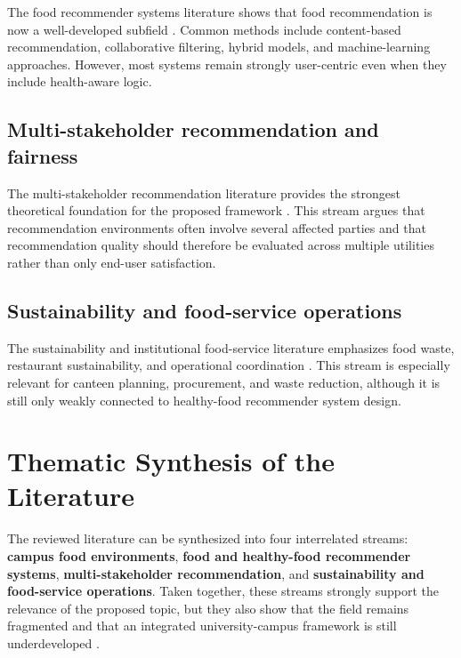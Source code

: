 \documentclass[journal]{IEEEtran}
\begin{document}
The food recommender systems literature shows that food recommendation
is now a well-developed subfield
\cite{bondevik2024, tran2018healthy, trattner2017food}. Common methods
include content-based recommendation, collaborative filtering, hybrid
models, and machine-learning approaches. However, most systems remain
strongly user-centric even when they include health-aware logic.

\subsection{Multi-stakeholder recommendation and
fairness}\label{multi-stakeholder-recommendation-and-fairness}

The multi-stakeholder recommendation literature provides the strongest
theoretical foundation for the proposed framework
\cite{zheng2017msr, abdollahpouri2019fairness, wu2021multifr}. This
stream argues that recommendation environments often involve several
affected parties and that recommendation quality should therefore be
evaluated across multiple utilities rather than only end-user
satisfaction.

\subsection{Sustainability and food-service
operations}\label{sustainability-and-food-service-operations}

The sustainability and institutional food-service literature emphasizes
food waste, restaurant sustainability, and operational coordination
\cite{peixoto2026sustainability, guimaraes2024waste}. This stream is
especially relevant for canteen planning, procurement, and waste
reduction, although it is still only weakly connected to healthy-food
recommender system design.

\section{Thematic Synthesis of the
Literature}\label{thematic-synthesis-of-the-literature}

The reviewed literature can be synthesized into four interrelated
streams: \textbf{campus food environments}, \textbf{food and
healthy-food recommender systems}, \textbf{multi-stakeholder
recommendation}, and \textbf{sustainability and food-service
operations}. Taken together, these streams strongly support the
relevance of the proposed topic, but they also show that the field
remains fragmented and that an integrated university-campus framework is
still underdeveloped
\cite{bondevik2024, caruso2025campus, zheng2017msr, peixoto2026sustainability}.
\end{document}
